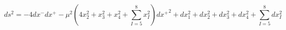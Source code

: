 \begin{equation}        \label{eq:IIAm1}
ds^2  = -4 dx^- dx^+  
- \mu^2 \left( 4x_2^2 + x_3^2 + x_4^2 + \sum_{I=5}^8 x_I^2 \right) d{x^+}^2  
 + dx_1^2 + dx_2^2 + dx_3^2 + dx_4^2 +\sum_{I=5}^8 dx_I^2 
\end{equation}

